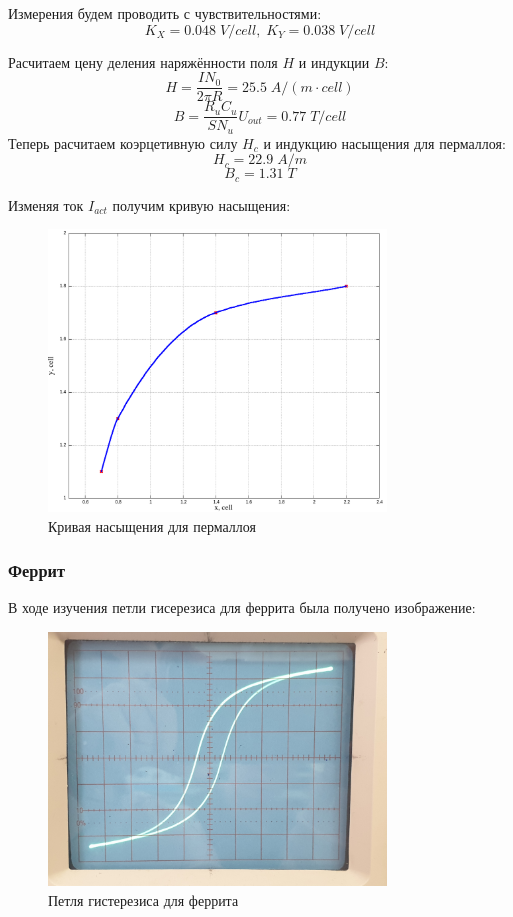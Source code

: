 \documentclass{article}
\begin{document}
Измерения будем проводить с чувствительностями:
\[ K_X = 0.048\; V/cell,\; K_Y = 0.038\; V/cell  \]

Расчитаем цену деления наряжённости поля $H$ и индукции $B$:
\[ H = \frac{IN_0}{2\pi R} = 25.5\; A/(m\cdot cell) \]
\[ B = \frac{R_uC_u}{SN_u}U_{out} = 0.77\; T/cell \]
Теперь расчитаем коэрцетивную силу $H_c$ и индукцию насыщения для пермаллоя:
\[ H_c = 22.9\; A/m \]
\[ B_c = 1.31\; T \]

Изменяя ток $I_{act}$ получим кривую насыщения:
\begin{figure}[H]
    \centering
    \includegraphics[width = 0.8\textwidth]{2-d.png}
    \caption{Кривая насыщения для пермаллоя}
\end{figure}

\subsubsection{Феррит}
В ходе изучения петли гисерезиса для феррита была получено изображение:
\begin{figure}[H]
    \centering
    \includegraphics[width = 0.8\textwidth]{3-1.jpg}
    \caption{Петля гистерезиса для феррита}
\end{figure}
\end{document}
